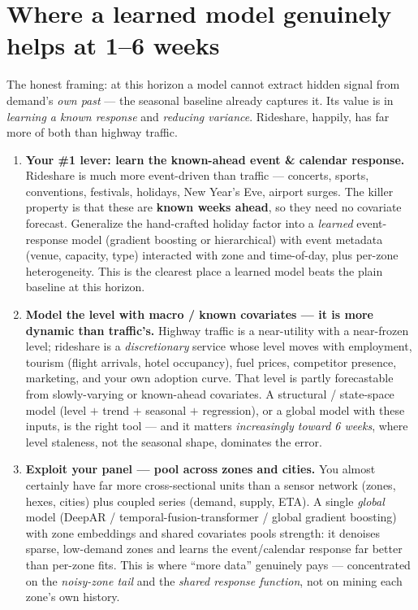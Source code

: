 \documentclass[11pt]{article}
\begin{document}
\section{Where a learned model genuinely helps at 1--6 weeks}

The honest framing: at this horizon a model cannot extract hidden signal from
demand's \emph{own past} --- the seasonal baseline already captures it. Its value is
in \emph{learning a known response} and \emph{reducing variance}. Rideshare,
happily, has far more of both than highway traffic.

\begin{enumerate}[leftmargin=*,resume]
\item \textbf{Your \#1 lever: learn the known-ahead event \& calendar response.}
Rideshare is much more event-driven than traffic --- concerts, sports, conventions,
festivals, holidays, New Year's Eve, airport surges. The killer property is that
these are \textbf{known weeks ahead}, so they need no covariate forecast. Generalize
the hand-crafted holiday factor into a \emph{learned} event-response model
(gradient boosting or hierarchical) with event metadata (venue, capacity, type)
interacted with zone and time-of-day, plus per-zone heterogeneity. This is the
clearest place a learned model beats the plain baseline at this horizon.

\item \textbf{Model the level with macro / known covariates --- it is more dynamic
than traffic's.} Highway traffic is a near-utility with a near-frozen level;
rideshare is a \emph{discretionary} service whose level moves with employment,
tourism (flight arrivals, hotel occupancy), fuel prices, competitor presence,
marketing, and your own adoption curve. That level is partly forecastable from
slowly-varying or known-ahead covariates. A structural / state-space model
(level $+$ trend $+$ seasonal $+$ regression), or a global model with these inputs,
is the right tool --- and it matters \emph{increasingly toward 6 weeks}, where level
staleness, not the seasonal shape, dominates the error.

\item \textbf{Exploit your panel --- pool across zones and cities.} You almost
certainly have far more cross-sectional units than a sensor network (zones, hexes,
cities) plus coupled series (demand, supply, ETA). A single \emph{global} model
(DeepAR / temporal-fusion-transformer / global gradient boosting) with zone
embeddings and shared covariates pools strength: it denoises sparse, low-demand
zones and learns the event/calendar response far better than per-zone fits. This is
where ``more data'' genuinely pays --- concentrated on the \emph{noisy-zone tail} and
the \emph{shared response function}, not on mining each zone's own history.


\end{enumerate}
\end{document}
